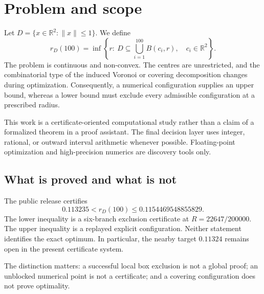 \section{Problem and scope}
Let $D=\{x\in\mathbb R^2:\|x\|\le 1\}$. We define
\[
r_D(100)=\inf\left\{r:\ D\subseteq\bigcup_{i=1}^{100}B(c_i,r),\quad c_i\in\mathbb R^2\right\}.
\]
The problem is continuous and non-convex. The centres are unrestricted, and the combinatorial type of the induced Voronoi or covering decomposition changes during optimization. Consequently, a numerical configuration supplies an upper bound, whereas a lower bound must exclude every admissible configuration at a prescribed radius.

This work is a certificate-oriented computational study rather than a claim of a formalized theorem in a proof assistant. The final decision layer uses integer, rational, or outward interval arithmetic whenever possible. Floating-point optimization and high-precision numerics are discovery tools only.

\subsection{What is proved and what is not}
The public release certifies
\[
  0.113235<r_D(100)\le 0.1154469548855829.
\]
The lower inequality is a six-branch exclusion certificate at $R=22647/200000$. The upper inequality is a replayed explicit configuration. Neither statement identifies the exact optimum. In particular, the nearby target $0.11324$ remains open in the present certificate system.

The distinction matters: a successful local box exclusion is not a global proof; an unblocked numerical point is not a certificate; and a covering configuration does not prove optimality.
